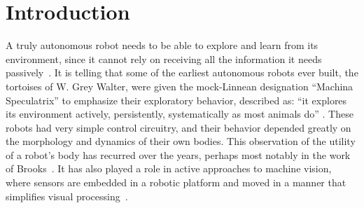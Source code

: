 
\section{Introduction}

A truly autonomous robot needs to be able to explore and learn from
its environment, since it cannot rely on receiving all the information
it needs passively~\cite{whaite97autonomous}.
It is telling that some of the earliest autonomous robots ever built,
the tortoises of W. Grey Walter, were given the mock-Linnean
designation ``Machina Speculatrix'' to emphasize their exploratory
behavior, described as: ``it explores its environment actively,
persistently, systematically as most animals do''
\cite{walter50imitation}.
These robots had very simple control circuitry, and their behavior
depended greatly on the morphology and dynamics of their own bodies.
%
This observation of the utility of a robot's body has recurred over
the years, perhaps most notably in the work of
Brooks~\cite{group-AAAI-98}.  It has also played a role in active
approaches to machine vision, where sensors are embedded in a robotic
platform and moved in a manner that simplifies visual
processing~\cite{ballard91animate}.




